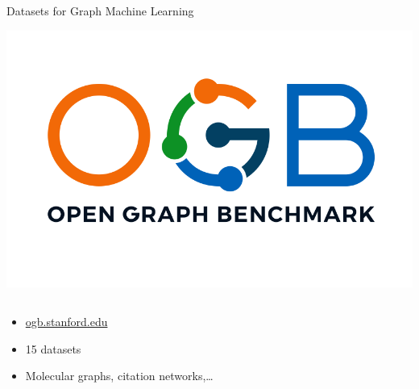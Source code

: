 \documentclass[11pt]{beamer}
\begin{document}
\begin{frame}[allowframebreaks] {Datasets for Graph Machine Learning}

 
  \begin{center}
    \includegraphics[width=.4\textwidth]{OGB}
  \end{center}

  \begin{columns}
    \begin{column}{.42\textwidth}
      {\small       \begin{itemize}
        \item\url{ogb.stanford.edu}
        \item 15 datasets
        \item Molecular graphs, citation networks,\dots
        \end{itemize}
      }
    \end{column}
    \begin{column}{.58\textwidth}
      
    \end{column}
  \end{columns}
    
  \break
\end{frame}
\end{document}
